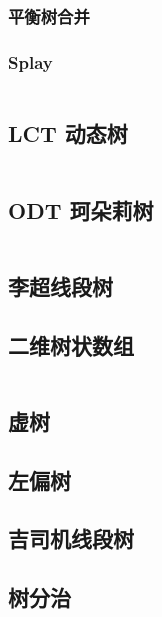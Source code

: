 \documentclass[10pt, a4paper, oneside]{ctexart}
\begin{document}
\begin{multicols}{2}
        \subsubsection{平衡树合并}
        
        \subsubsection{Splay}
        \inputminted{cpp}{src/data structure/splay.cpp} %
        \subsection{LCT 动态树}
        \inputminted{cpp}{src/data structure/LCT.cpp} %
        \subsection{ODT 珂朵莉树}
        \inputminted{cpp}{src/data structure/ODT.cpp}
        \subsection{李超线段树}
        
        \subsection{二维树状数组}
        \inputminted{cpp}{src/data structure/2D-BIT.cpp}
        \subsection{虚树}
        
        \subsection{左偏树}
        
        \subsection{吉司机线段树}
        
        \subsection{树分治}
        


\end{multicols}
\end{document}
